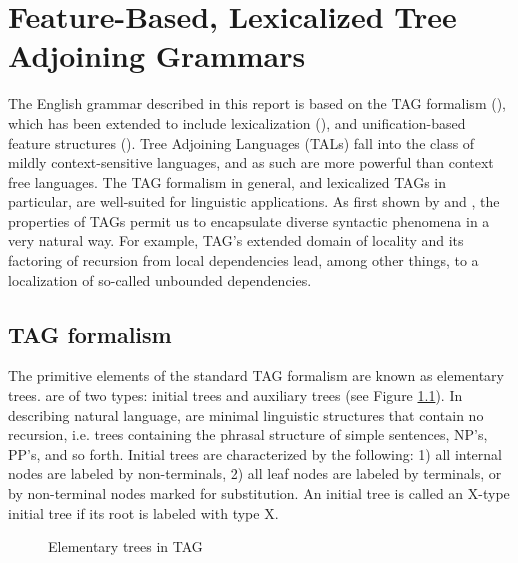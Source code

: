 \chapter{Feature-Based, Lexicalized Tree Adjoining Grammars}
\label{intro-FBLTAG}

The English grammar described in this report is based on the TAG formalism
(\cite{joshi75}), which has been extended to include lexicalization
(\cite{schabes88}), and unification-based feature structures
(\cite{vijay91}). Tree Adjoining Languages (TALs) fall into the class of mildly
context-sensitive languages, and as such are more powerful than context free
languages.  The TAG formalism in general, and lexicalized TAGs in particular,
are well-suited for linguistic applications.  As first shown by \cite{joshi85}
and \cite{kj87}, the properties of TAGs permit us to encapsulate diverse
syntactic phenomena in a very natural way.  For example, TAG's extended domain
of locality and its factoring of recursion from local dependencies lead, among
other things, to a localization of so-called unbounded dependencies.

\section{TAG formalism}

The primitive elements of the standard TAG formalism are known as elementary
trees.   are of two types: initial trees and
auxiliary trees (see Figure \ref{elem-fig}).  In describing natural language,
 are minimal linguistic structures that contain no
recursion, i.e. trees containing the phrasal structure of simple sentences,
NP's, PP's, and so forth.  Initial trees are characterized by the following: 1)
all internal nodes are labeled by non-terminals, 2) all leaf nodes are labeled
by terminals, or by non-terminal nodes marked for substitution. An initial tree
is called an X-type initial tree if its root is labeled with type X.

\begin{figure}[htb]
\centering
{}
\caption{Elementary trees in TAG}
\label{elem-fig}
\end{figure}

